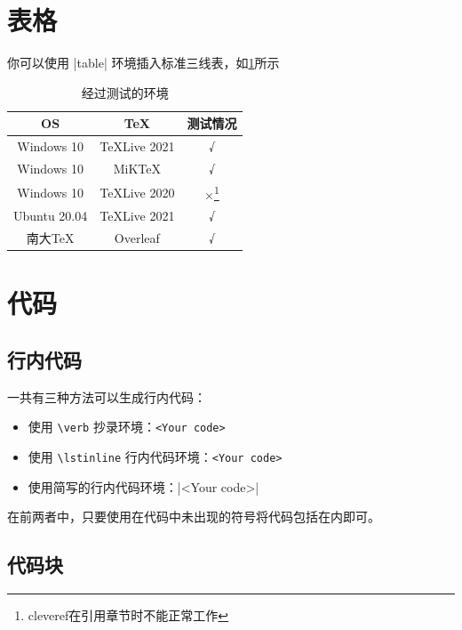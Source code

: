 \section{表格}

你可以使用 |table| 环境插入标准三线表，如\cref{tab:testtab}所示

\begin{table}[htbp]
    \centering
    \caption{经过测试的环境}
    \label{tab:testtab}
    \begin{tabular}{ccc}
        \toprule
        OS & TeX & 测试情况 \\
        \midrule
        Windows 10 & TeXLive 2021 & √ \\
        Windows 10 & MiKTeX & √ \\
        Windows 10 & TeXLive 2020 & ×\footnote{cleveref在引用章节时不能正常工作}  \\
        Ubuntu 20.04 & TeXLive 2021 & √ \\
        南大TeX & Overleaf & √ \\
        \bottomrule
    \end{tabular}
\end{table}

\section{代码}

\subsection{行内代码}

一共有三种方法可以生成行内代码：
\begin{itemize}
    \item 使用 \texttt{\textbackslash verb} 抄录环境：\verb!<Your code>!
    \item 使用 \texttt{\textbackslash lstinline} 行内代码环境：\lstinline[basicstyle=\tt]+<Your code>+
    \item 使用简写的行内代码环境：|<Your code>|
\end{itemize}
在前两者中，只要使用在代码中未出现的符号将代码包括在内即可。

\subsection{代码块}

